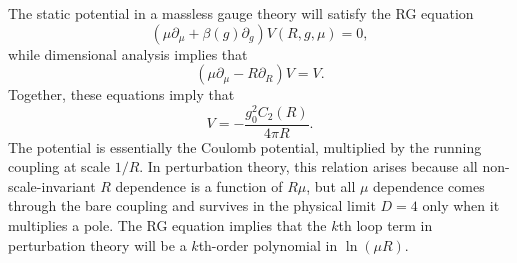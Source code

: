 The static potential in a massless gauge theory will satisfy the RG equation
\[
  (\mu\partial_\mu+\beta(g)\partial_g)V(R,g,\mu)=0,
\]
while dimensional analysis implies that
\[
  (\mu\partial_\mu-R\partial_R)V=V.
\]
Together, these equations imply that
\[
  V=-\frac{g_0^2C_2(R)}{4\pi R}.
\]
The potential is essentially the Coulomb potential, multiplied by the running
coupling at scale $1/R$. In perturbation theory, this relation arises because
all non-scale-invariant $R$ dependence is a function of $R\mu$, but all $\mu$
dependence comes through the bare coupling and survives in the physical limit
$D=4$ only
when it multiplies a pole. The RG equation implies that the $k$th loop term in
perturbation theory will be a $k$th-order polynomial in $\ln(\mu R)$.

